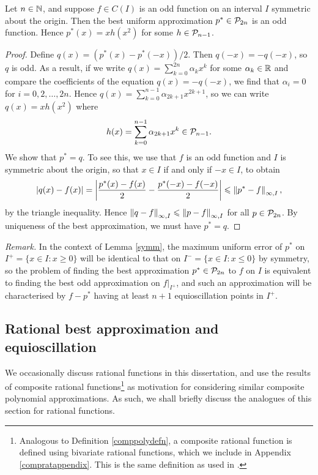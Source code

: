 \begin{lemma}\label{symm}
Let $n\in\mathbb{N}$, and suppose $f\in C(I)$ is an odd function on an interval $I$ symmetric about the origin. Then the best uniform approximation $p^* \in \mathcal{P}_{2n}$ is an odd function. Hence $p^*(x)=xh(x^2)$ for some $h \in \mathcal{P}_{n-1}$.
\end{lemma}

\begin{proof}
Define $q(x)=(p^*(x)-p^*(-x))/2$. Then $q(-x)=-q(-x)$, so $q$ is odd. As a result, if we write $q(x)=\sum_{k=0}^{2n} \alpha_k x^k$ for some $\alpha_k \in \mathbb{R}$ and compare the coefficients of the equation $q(x)=-q(-x)$, we find that $\alpha_i=0$ for $i=0,2,\dots,2n$. Hence $q(x)=\sum_{k=0}^{n-1} \alpha_{2k+1}x^{2k+1}$, so we can write $q(x)=xh(x^2)$ where 
\[h(x)=\sum_{k=0}^{n-1}\alpha_{2k+1}x^k \in \mathcal{P}_{n-1}.\]
We show that $p^*=q$. To see this, we use that $f$ is an odd function and $I$ is symmetric about the origin, so that $x \in I$ if and only if $-x \in I$, to obtain
\[ |q(x)-f(x)| = \left|\dfrac{p^*(x)-f(x)}{2}-\dfrac{p^*(-x)-f(-x)}{2}\right| \leqslant \left\lVert p^*-f\right\rVert_{\infty,I},\]
by the triangle inequality. Hence $\left\lVert q-f\right\rVert_{\infty,I} \leqslant \left\lVert p-f\right\rVert_{\infty,I}$ for all $p\in\mathcal{P}_{2n}$. By uniqueness of the best approximation, we must have $p^*=q$.
\end{proof}

\textit{Remark.} In the context of Lemma \ref{symm}, the maximum uniform error of $p^*$ on $I^+=\{x \in I: x \geq 0\}$ will be identical to that on $I^-=\{x \in I: x \leq 0\}$ by symmetry, so the problem of finding the best approximation $p^*\in \mathcal{P}_{2n}$ to $f$ on $I$ is equivalent to finding the best odd approximation on $f|_{I^+}$, and such an approximation will be characterised by $f-p^*$ having at least $n+1$ equioscillation points in $I^+$. 

\subsection{Rational best approximation and equioscillation}

We occasionally discuss rational functions in this dissertation, and use the results of composite rational functions\footnote{Analogous to Definition \ref{comppolydefn}, a composite rational function is defined using bivariate rational functions, which we include in Appendix \ref{compratappendix}. This is the same definition as used in \cite{Yuji}.} as motivation for considering similar composite polynomial approximations. As such, we shall briefly discuss the analogues of this section for rational functions. 


